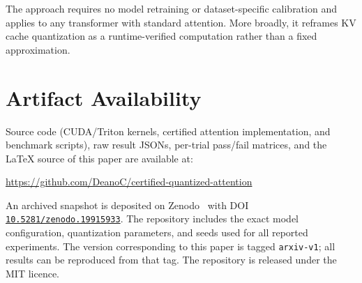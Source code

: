\documentclass[10pt,twocolumn,a4paper]{article}
\theoremstyle{definition}
\theoremstyle{remark}
\begin{document}
The approach requires no model retraining or dataset-specific calibration and applies to any transformer with standard attention.  More broadly, it reframes KV cache quantization as a runtime-verified computation rather than a fixed approximation.



\section*{Artifact Availability}

Source code (CUDA/Triton kernels, certified attention implementation, and benchmark scripts), raw result JSONs, per-trial pass/fail matrices, and the \LaTeX{} source of this paper are available at:
\begin{center}
\url{https://github.com/DeanoC/certified-quantized-attention}
\end{center}
An archived snapshot is deposited on Zenodo~\cite{zenodo_artifact} with DOI \href{https://doi.org/10.5281/zenodo.19915933}{\texttt{10.5281/zenodo.19915933}}.
The repository includes the exact model configuration, quantization parameters, and seeds used for all reported experiments.  The version corresponding to this paper is tagged \texttt{arxiv-v1}; all results can be reproduced from that tag.  The repository is released under the MIT licence.
\end{document}
